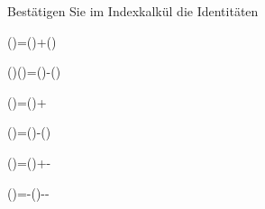 \begin{atiTask}[
  title = Vektoroperatoridentitäten II
]
Bestätigen Sie im Indexkalkül die Identitäten
\begin{atiSubequations}
\item{\gradient ()=(\gradient)+(\gradient)}
%
\item{(\gradient)(\times {})=\times (\gradient )-\times (\gradient)}
%
\item{(\nabla {})=(\gradient)+\divergence {}}
%
\item{(\times {})\curl {}=(\gradient)-(\gradient)}
%
\item{(\times \gradient)\times {}=(\gradient)+\times \curl {}-\divergence {}}
%
\item{(\nabla\times{})\times{}=\divergence {}-(\gradient)-\times \curl {}-\times \curl {}}
%
\end{atiSubequations}


\end{atiTask}

\begin{atiSolution}
	
\end{atiSolution}
